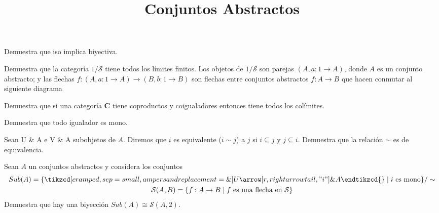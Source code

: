 \documentclass{exam}
\title{Conjuntos Abstractos}
\author{}
\date{}
\newcommand{\n}[1]{\boldsymbol{#1}}
\theoremstyle{definition}
\newcommand{\tq}{\;|\;}
\begin{document}
\maketitle

\begin{randomizedquestions}
\question Demuestra que iso implica biyectiva.

\question Demuestra que la categoría $1/\mathcal{S}$ tiene todos los límites finitos. Los objetos de $1/\mathcal{S}$ son parejas $(A,a:1\to A)$, donde $A$ es un conjunto abstracto; y las flechas $f:(A,a:1\to A)\to(B,b:1\to B)$ son flechas entre conjuntos abstractos $f:A\to B$ que hacen conmutar al siguiente diagrama
\begin{center}
\end{center}

\question Demuestra que si una categoría $\n{C}$ tiene coproductos y coigualadores entonces tiene todos los colímites.

\question Demuestra que todo igualador es mono.

\question Sean \tikzcd[cramped, sep=small,ampersand replacement=\&] U \arrow[r, rightarrowtail, "i"] \& A \endtikzcd{} e \tikzcd[cramped, sep=small,ampersand replacement=\&] V \arrow[r, rightarrowtail, "j"] \& A \endtikzcd{} subobjetos de $A$. Diremos que $i$ es equivalente ($i\sim j$) a $j$ si $i\subseteq j$ y $j\subseteq i$. Demuestra que la relación $\sim$ es de equivalencia.

\question Sean $A$ un conjuntos abstractos y considera los conjuntos
\begin{gather*}
Sub(A)=\{\tikzcd[cramped, sep=small, ampersand replacement=\&] U \arrow[r, rightarrowtail, "i"] \& A \endtikzcd{}
         \tq \text{$i$ es mono}\}/\sim \\
\mathcal{S}(A,B)=\{f:A\to B\tq\text{$f$ es una flecha en $\mathcal{S}$}\}
\end{gather*}
Demuestra que hay una biyección $Sub(A)\cong\mathcal{S}(A,2)$.
\end{randomizedquestions}
\end{document}
